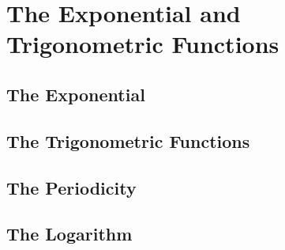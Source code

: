 \section{The Exponential and Trigonometric Functions}
\subsection{The Exponential}

\subsection{The Trigonometric Functions}

\subsection{The Periodicity}

\subsection{The Logarithm}
